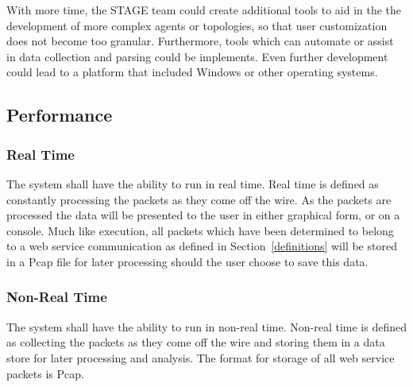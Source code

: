 \documentclass[titlepage]{article}
\begin{document}
With more time, the STAGE team could create additional tools to aid in the the development of more complex agents or topologies, so that user customization does not become too granular.  Furthermore, tools which can automate or assist in data collection and parsing could be implements.  Even further development could lead to a platform that included Windows or other operating systems.


\subsection{Performance%
    \label{performance}%
}


\subsubsection{Real Time}\label{realtime} 
The system shall have the ability to run in real time. Real time is defined as
constantly processing the packets as they come off the wire. As the packets are
processed the data will be presented to the user in either graphical form, or
on a console.  Much like  execution, all packets which
have been determined to belong to a web service communication as defined in
Section~\ref{definitions} will be stored in a Pcap file for later processing
should the user choose to save this data.


\subsubsection{Non-Real Time}\label{nonrealtime}
The system shall have the ability to run in non-real time. Non-real time is
defined as collecting the packets as they come off the wire and storing them in
a data store for later processing and analysis.  The format for storage of all  
web service packets is Pcap.

\end{document}
